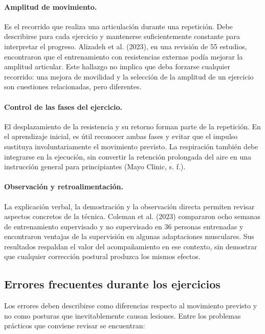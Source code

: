 \paragraph{Amplitud de movimiento.}
Es el recorrido que realiza una articulación durante una repetición. Debe describirse para cada ejercicio y mantenerse suficientemente constante para interpretar el progreso. Alizadeh et al. (2023), en una revisión de 55 estudios, encontraron que el entrenamiento con resistencias externas podía mejorar la amplitud articular. Este hallazgo no implica que deba forzarse cualquier recorrido: una mejora de movilidad y la selección de la amplitud de un ejercicio son cuestiones relacionadas, pero diferentes.

\paragraph{Control de las fases del ejercicio.}
El desplazamiento de la resistencia y su retorno forman parte de la repetición. En el aprendizaje inicial, es útil reconocer ambas fases y evitar que el impulso sustituya involuntariamente el movimiento previsto. La respiración también debe integrarse en la ejecución, sin convertir la retención prolongada del aire en una instrucción general para principiantes (Mayo Clinic, s. f.).

\paragraph{Observación y retroalimentación.}
La explicación verbal, la demostración y la observación directa permiten revisar aspectos concretos de la técnica. Coleman et al. (2023) compararon ocho semanas de entrenamiento supervisado y no supervisado en 36 personas entrenadas y encontraron ventajas de la supervisión en algunas adaptaciones musculares. Sus resultados respaldan el valor del acompañamiento en ese contexto, sin demostrar que cualquier corrección postural produzca los mismos efectos.

\subsection{Errores frecuentes durante los ejercicios}

Los errores deben describirse como diferencias respecto al movimiento previsto y no como posturas que inevitablemente causan lesiones. Entre los problemas prácticos que conviene revisar se encuentran:

